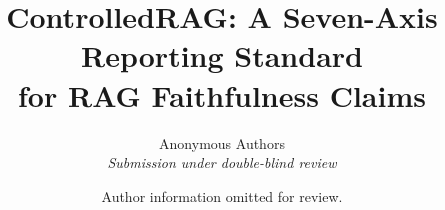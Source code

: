 \documentclass[10pt]{article}                  %
\title{\Large\bfseries ControlledRAG: A Seven-Axis Reporting Standard\\[0.2em]
for RAG Faithfulness Claims}
\author{Anonymous Authors\\\textit{Submission under double-blind review}}
\author{Author information omitted for review.}
\date{}
\theoremstyle{plain}
\theoremstyle{definition}
\begin{document}
\maketitle

\begin{abstract}

\end{abstract}



{\footnotesize


}


\end{document}
